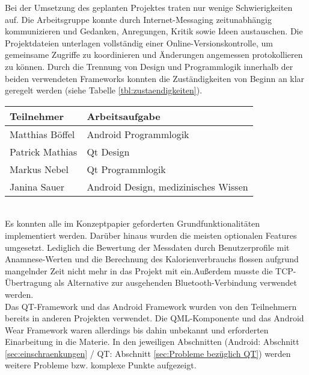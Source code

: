 Bei der Umsetzung des geplanten Projektes traten nur wenige Schwierigkeiten auf. Die Arbeitsgruppe konnte durch Internet-Messaging zeitunabhängig kommunizieren und Gedanken, Anregungen, Kritik sowie Ideen austauschen. Die Projektdateien unterlagen vollständig einer Online-Versionskontrolle, um gemeinsame Zugriffe zu koordinieren und Änderungen angemessen protokollieren zu können. Durch die Trennung von Design und Programmlogik innerhalb der beiden verwendeten Frameworks konnten die Zuständigkeiten von Beginn an klar geregelt werden (siehe Tabelle \ref{tbl:zustaendigkeiten}).\\
\begin{table*}[h]
	\centering
		\begin{tabularx}{\textwidth}{l|X}
			\hline
			Teilnehmer & Arbeitsaufgabe \\
			\hline
			\hline
			Matthias Böffel & Android Programmlogik\\
			\hline
			Patrick Mathias & Qt Design\\
			\hline
			Markus Nebel & Qt Programmlogik\\
			\hline
			Janina Sauer & Android Design, medizinisches Wissen\\
			\hline
		\end{tabularx}
		\caption{Arbeitsaufgaben der Teilnehmer}
		\label{tbl:zustaendigkeiten}
\end{table*}
\\
Es konnten alle im Konzeptpapier geforderten Grundfunktionalitäten implementiert werden. Darüber hinaus wurden die meisten optionalen Features umgesetzt. Lediglich die Bewertung der Messdaten durch Benutzerprofile mit Anamnese-Werten und die Berechnung des Kalorienverbrauchs flossen aufgrund mangelnder Zeit nicht mehr in das Projekt mit ein.Außerdem musste die TCP-Übertragung als Alternative zur ausgehenden Bluetooth-Verbindung verwendet werden.
\\[0.5cm]
Das QT-Framework und das Android Framework wurden von den Teilnehmern bereits in anderen Projekten verwendet. Die QML-Komponente und das Android Wear Framework waren allerdings bis dahin unbekannt und erforderten Einarbeitung in die Materie. In den jeweiligen Abschnitten (Android: Abschnitt \ref{sec:einschraenkungen} / QT: Abschnitt \ref{sec:Probleme bezüglich QT}) werden weitere Probleme bzw. komplexe Punkte aufgezeigt.
